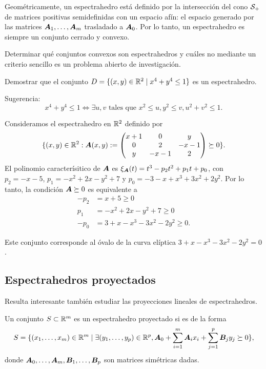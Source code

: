 Geométricamente, un espectrahedro está definido por la intersección del cono ${\mathcal S_+}$ de matrices positivas semidefinidas con un espacio afín: el espacio generado por las matrices $\bm{A}_1, \dots, \bm{A}_m$ trasladado a $\bm{A}_0$. Por lo tanto, un espectrahedro es siempre un conjunto cerrado y convexo.

Determinar qué conjuntos convexos son espectrahedros y cuáles no mediante un criterio sencillo es un problema abierto de investigación.

\begin{ejercicio}
Demostrar que el conjunto  $D = \{(x,y) \in \mathbb{R}^2 \mid x^4 + y^4 \le 1\}$ es un espectrahedro.

Sugerencia:
$$
x^4 + y^4 \le 1 \iff \exists u, v \text{ tales que } x^2 \le u, y^2 \le v, u^2 + v^2 \le 1.
$$
\end{ejercicio}



\begin{example}
Consideramos el espectrahedro en $\mathbb{R}^2$ definido por
$$
\{
(x, y) \in \mathbb{R}^2 : \bm{A}(x,y) := \begin{pmatrix}
x+1 & 0    & y    \\
0   & 2    & -x-1 \\
y   & -x-1 & 2
\end{pmatrix} \succeq 0
\}.
$$
El polinomio caracterísitico de $\bm{A}$ es $\xi_{\bm{A}}(t) = t^3 - p_2 t^2 + p_1 t + p_0$, con $p_2 = -x-5$, $p_1 =-x^2 +2x-y^2 + 7$ y $p_0 = -3 -x+x^3+3x^2+2y^2$. Por lo tanto, la condición $\bm{A} \succeq 0$ es equivalente a
\begin{align*}
-p_2 &= x + 5 \ge 0 \\
p_1 &= -x^2 + 2x - y^2 + 7 \ge 0 \\
-p_0 &= 3 + x -x^3-3x^2-2y^2 \ge 0.
\end{align*}

Este conjunto corresponde al óvalo de la curva elíptica $3 + x -x^3-3x^2-2y^2 = 0$.
\end{example}

\subsection{Espectrahedros proyectados}

Resulta interesante también estudiar las proyecciones lineales de espectrahedros.

\begin{definition}
Un conjunto $S \subset \mathbb{R}^m$ es un espectrahedro proyectado si es de la forma
$$
S = \{(x_1, \dots, x_m) \in \mathbb{R}^m \mid \exists (y_1, \dots, y_p) \in \mathbb{R}^p, \bm{A}_0 + \sum_{i=1}^m \bm{A}_i x_i + \sum_{j = 1}^p \bm{B}_j y_j \succeq 0\},
$$
donde $\bm{A}_0, \dots, \bm{A}_m, \bm{B}_1, \dots, \bm{B}_p$ son matrices simétricas dadas.
\end{definition}

